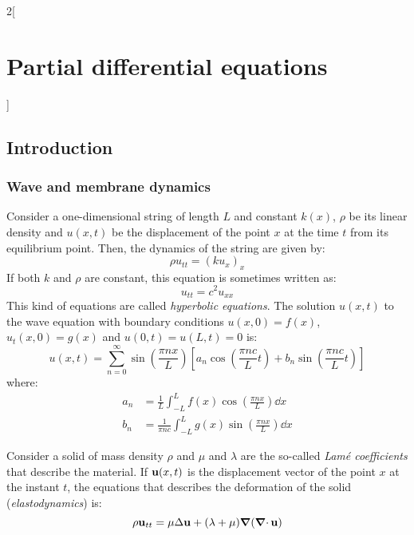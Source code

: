 \documentclass[../../../main.tex]{subfiles}
\begin{document}
\renewcommand{\col}{\apl}
\begin{multicols}{2}[\section{Partial differential equations}]
  \subsection{Introduction}
  \subsubsection{Wave and membrane dynamics}
  \begin{proposition}
    Consider a one-dimensional string of length $L$ and constant $k(x)$, $\rho$ be its linear density and $u(x,t)$ be the displacement of the point $x$ at the time $t$ from its equilibrium point. Then, the dynamics of the string are given by: $$\rho u_{tt}={(ku_x)}_x$$ If both $k$ and $\rho$ are constant, this equation is sometimes written as:
    \begin{equation}\label{PDE_waveeq}
      u_{tt}=c^2u_{xx}
    \end{equation}
    This kind of equations are called \emph{hyperbolic equations}. The solution $u(x,t)$ to the wave equation with boundary conditions $u(x,0)=f(x)$, $u_t(x,0)=g(x)$ and $u(0,t)=u(L,t)=0$ is: $$u(x,t)=\sum_{n=0}^\infty \sin\left(\frac{\pi n x}{L}\right)\left[a_n\cos\left(\frac{\pi n c}{L}t\right)+ b_n\sin\left( \frac{\pi n c}{L}t\right)\right]$$ where:
    \begin{align*}
      a_n & =\frac{1}{L}\int_{-L}^Lf(x)\cos\left(\frac{\pi n x}{L}\right)\dd{x}       \\
      b_n & =\frac{1}{\pi n c}\int_{-L}^Lg(x)\sin\left(\frac{\pi n x}{L}\right)\dd{x}
    \end{align*}
  \end{proposition}
  \begin{proposition}
    Consider a solid of mass density $\rho$ and $\mu$ and $\lambda$ are the so-called \emph{Lamé coefficients} that describe the material. If $\boldsymbol{\mathrm{u}}(x,t)$ is the displacement vector of the point $x$ at the instant $t$, the equations that describes the deformation of the solid (\emph{elastodynamics}) is:
    $$\rho\boldsymbol{\mathrm{u}}_{tt}=\mu\Delta\boldsymbol{\mathrm{u}}+(\lambda+\mu)\grad(\operatorname{\boldsymbol{\mathrm{\nabla}}\cdot}{\boldsymbol{\mathrm{u}}})$$
  \end{proposition}

\end{multicols}
\end{document}
